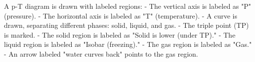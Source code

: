 A p-T diagram is drawn with labeled regions:  
- The vertical axis is labeled as "P" (pressure).  
- The horizontal axis is labeled as "T" (temperature).  
- A curve is drawn, separating different phases: solid, liquid, and gas.  
- The triple point (TP) is marked.  
- The solid region is labeled as "Solid is lower (under TP)."  
- The liquid region is labeled as "Isobar (freezing)."  
- The gas region is labeled as "Gas."  
- An arrow labeled "water curves back" points to the gas region.